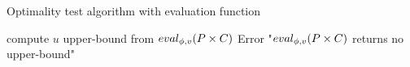 \begin{algorithm}[ht]
    \caption{Optimality test algorithm with evaluation function}
\begin{algorithmic}[1]
    \State compute $u$ upper-bound from $eval_{\phi,v}(P \times C)$
        \State Error "$eval_{\phi,v}(P \times C)$ returns no upper-bound"
    \EndIf
    \State \Return {}
\EndProcedure
\end{algorithmic}
\end{algorithm}

